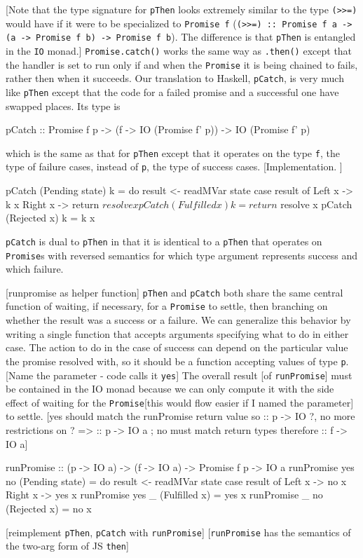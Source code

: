 \documentclass[12pt, english, letterpaper]{kuthesis}
\newcommand{\lit}[1]{\texttt{#1}}
\begin{document}
 [Note that the type signature for \lit{pThen} looks extremely similar to the type \lit{(>>=)} would have if it were to be specialized to \lit{Promise f} (\lit{(>>=) :: Promise f a -> (a -> Promise f b) -> Promise f b}).  The difference is that \lit{pThen} is entangled in the \lit{IO} monad.]
 \lit{Promise.catch()} works the same way as \lit{.then()} except that the handler is set to run only if and when the \lit{Promise} it is being chained to fails, rather then when it succeeds.  Our translation to Haskell, \lit{pCatch}, is very much like \lit{pThen} except that the code for a failed promise and a successful one have swapped places.  Its type is
 \begin{code}
pCatch :: Promise f p
        -> (f -> IO (Promise f' p))
        -> IO (Promise f' p)
\end{code}
which is the same as that for \lit{pThen} except that it operates on the type \lit f, the type of failure cases, instead of \lit p, the type of success cases. [Implementation. ]
\begin{code}
pCatch (Pending state) k = do
  result <- readMVar state
  case result of
    Left x -> k x
    Right x -> return $ resolve x
pCatch (Fulfilled x) k = return $ resolve x
pCatch (Rejected x) k = k x
\end{code}
\lit{pCatch} is dual to \lit{pThen} in that it is identical to a \lit{pThen} that operates on \lit{Promise}s with reversed semantics for which type argument represents success and which failure.

[runpromise as helper function]
\lit{pThen} and \lit{pCatch} both share the same central function of waiting, if necessary, for a \lit{Promise} to settle, then branching on whether the result was a success or a failure.  We can generalize this behavior by writing a single function that accepts arguments specifying what to do in either case.  The action to do in the case of success can depend on the particular value the promise resolved with, so it should be a function accepting values of type \lit p.[Name the parameter - code calls it \lit{yes}]  The overall result [of \lit{runPromise}] must be contained in the IO monad because we can only compute it with the side effect of waiting for the \lit{Promise}[this would flow easier if I named the parameter] to settle.  [yes should match the runPromise return value so :: p -> IO ?, no more restrictions on ? => :: p -> IO a ; no must match return types therefore :: f -> IO a]

\begin{code}
runPromise :: (p -> IO a) -> (f -> IO a) -> Promise f p -> IO a
runPromise yes no (Pending state) = do
  result <- readMVar state
  case result of
    Left x -> no x
    Right x -> yes x
runPromise yes _ (Fulfilled x) = yes x
runPromise _ no (Rejected x) = no x

\end{code}
[reimplement \lit{pThen}, \lit{pCatch} with \lit{runPromise}]
[\lit{runPromise} has the semantics of the two-arg form of JS \lit{then}]
\end{document}
